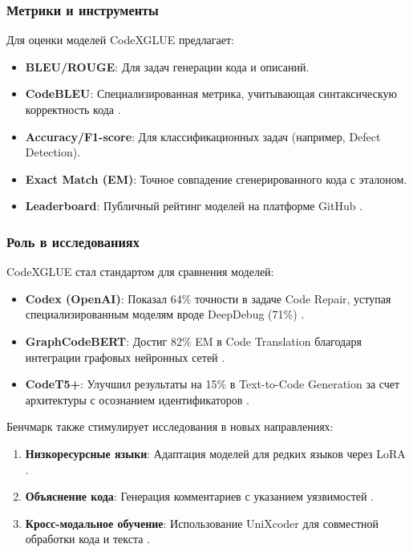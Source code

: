 \documentclass[14pt]{article}
\theoremstyle{definition}
\begin{document}
\subsubsection{Метрики и инструменты}
Для оценки моделей CodeXGLUE предлагает:
\begin{itemize}
    \item \textbf{BLEU/ROUGE}: Для задач генерации кода и описаний.
    \item \textbf{CodeBLEU}: Специализированная метрика, учитывающая синтаксическую корректность кода \cite{ren2021codebleu}.
    \item \textbf{Accuracy/F1-score}: Для классификационных задач (например, Defect Detection).
    \item \textbf{Exact Match (EM)}: Точное совпадение сгенерированного кода с эталоном.
    \item \textbf{Leaderboard}: Публичный рейтинг моделей на платформе GitHub \cite{codexglue_repo}.
\end{itemize}

\subsubsection{Роль в исследованиях}
CodeXGLUE стал стандартом для сравнения моделей:
\begin{itemize}
    \item \textbf{Codex (OpenAI)}: Показал 64\% точности в задаче Code Repair, уступая специализированным моделям вроде DeepDebug (71\%) \cite{lu2021codexglue}.
    \item \textbf{GraphCodeBERT}: Достиг 82\% EM в Code Translation благодаря интеграции графовых нейронных сетей \cite{guo2021graphcodebert}.
    \item \textbf{CodeT5+}: Улучшил результаты на 15\% в Text-to-Code Generation за счет архитектуры с осознанием идентификаторов \cite{wan2023codet5+}.
\end{itemize}

Бенчмарк также стимулирует исследования в новых направлениях:
\begin{enumerate}
    \item \textbf{Низкоресурсные языки}: Адаптация моделей для редких языков через LoRA \cite{hu2022lora}.
    \item \textbf{Объяснение кода}: Генерация комментариев с указанием уязвимостей \cite{zhou2022devign}.
    \item \textbf{Кросс-модальное обучение}: Использование UniXcoder для совместной обработки кода и текста \cite{guo2022unixcoder}.
\end{enumerate}
\end{document}
